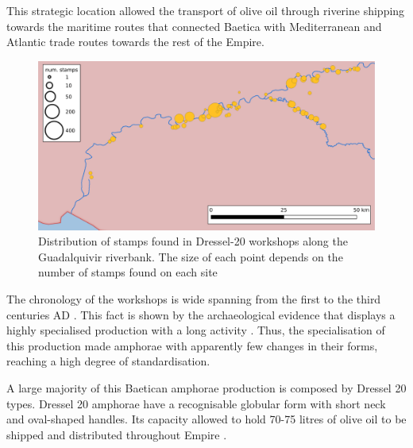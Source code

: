 \documentclass[review]{elsarticle}
\newcommand{\memo}[2]{\textcolor{#1}{#2}}
\newcommand{\xavi}[1]{\memo{magenta}{XRC: #1\\}}
\begin{document}
This strategic location allowed the transport of olive oil through riverine shipping towards the maritime routes that connected Baetica with Mediterranean and Atlantic trade routes towards the rest of the Empire\citep{garcia_vargas_enrique_formal_2010}.

\begin{figure}[htp]
	\centering
\includegraphics[width=\linewidth]{figs/baetica}
\caption{Distribution of stamps found in Dressel-20 workshops along the Guadalquivir riverbank. The size of each point depends on the number of stamps found on each site}

\label{workshop}
\end{figure} 


The chronology of the workshops is wide spanning from the first to the third centuries AD
\citep{millet_anforas_1998,rodriguez_baetican_1998,chic2005comercio}. 
This fact is shown by the archaeological evidence that displays a highly specialised production with a long activity \citep{remesal_anforas_2004}. Thus, the specialisation of this production made amphorae with apparently few changes in their forms, reaching a high degree of standardisation. 




A large majority of this Baetican amphorae production is composed by Dressel 20 types\citep{dressel_ricerche_1878,millet_anforas_1998}. Dressel 20 amphorae have a recognisable globular form with short neck and oval-shaped handles. Its  capacity allowed to hold 70-75 litres of olive oil to be shipped and distributed throughout Empire \citep{berni_dressel_2016}.


\end{document}
